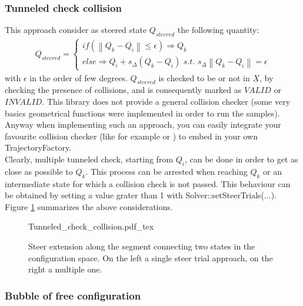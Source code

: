 \subsubsection{Tunneled check collision}

This approach consider as steered state $Q_{steered}$ the following quantity:
\begin{eqnarray}
Q_{steered} = \left\{\begin{matrix}
\textit{if} (\left \| Q_k - Q_i \right \| \leq \epsilon) \Rightarrow Q_k 
\\ 
\textit{else} \Rightarrow Q_i + s_{\Delta} ( Q_k - Q_i ) \textit{   s.t.   } s_{\Delta} \left \| Q_k - Q_i  \right \| = \epsilon
\end{matrix}\right.
\end{eqnarray}
with $\epsilon$ in the order of few degrees. $Q_{steered}$ is checked to be or not in $\underline{X}$, by checking the presence of collisions, and is consequently marked as $VALID$ or $INVALID$. 
This library does not provide a general collision checker (some very basics geometrical functions were implemented in order to run the samples). Anyway when implementing such an approach, you can easily integrate your favourite collision checker (like for example \cite{Bullet} or \cite{React}) to embed in your own TrajectoryFactory.
\\
Clearly, multiple tunneled check, starting from $Q_i$, can be done in order to get as close as possible to $Q_k$. This process can be arrested when reaching $Q_k$ or an intermediate state for which a collision check is not passed. This behaviour can be obtained by setting a value grater than 1 with Solver::setSteerTrials(...).
\\
Figure \ref{fig:Tunnel_check} summarizes the above considerations.

 \begin{figure}
	 \centering
 \def\svgwidth{0.45 \columnwidth}
 {Tunneled_check_collision.pdf_tex} 
	 \caption{Steer extension along the segment connecting two states in the configuration space. On the left a single steer trial approach, on the right a multiple one.}
 \label{fig:Tunnel_check}
 \end{figure}

\subsubsection{Bubble of free configuration}

